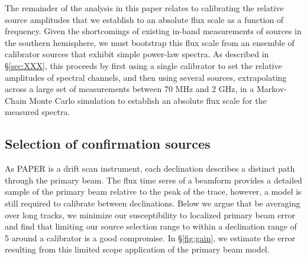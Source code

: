 \documentclass[preprint]{aastex}
\begin{document}
The remainder of the analysis in this paper relates to calibrating the relative source amplitudes that we
establish to an absolute flux scale as a function of frequency.  Given the shortcomings of 
existing in-band measurements of sources
in the southern hemisphere, we must bootstrap this flux scale from an ensemble of calibrator sources that
exhibit simple power-law spectra.
As described in \S\ref{sec:XXX},
this proceeds by first using a single calibrator to set the relative amplitudes of spectral channels, and
then using several sources, extrapolating across a large set of measurements 
between 70 MHz and 2 GHz, in a Markov-Chain Monte Carlo simulation to establish an absolute flux scale
for the measured spectra.


\subsection{Selection of confirmation sources} %
As PAPER is a drift scan instrument, each declination describes a distinct path through the primary beam. The flux time seres of a beamform
 provides a detailed sample of the primary beam relative to the peak of the trace, however,
a model is still required to calibrate between declinations. Below we argue that be averaging over long tracks, we minimize our 
susceptibility to localized primary beam error and find that limiting our source selection range to within 
a declination range of 5\arcdeg{} around a calibrator is a good compromise. In \S\ref{fig:gain},
we estimate the error resulting from this limited scope application of the primary beam model.
\end{document}

